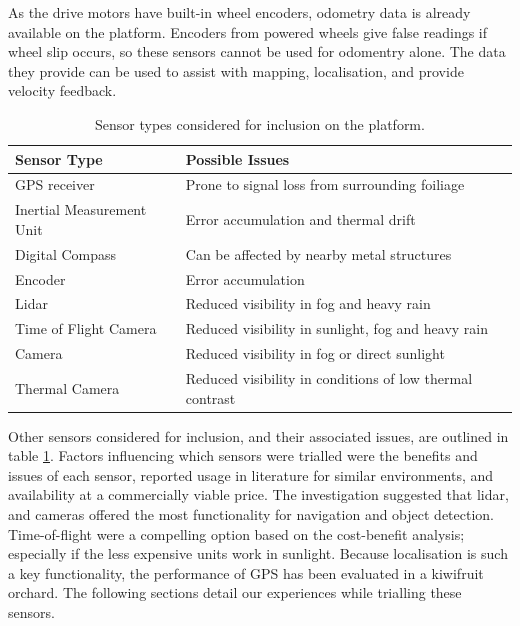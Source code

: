 \documentclass[preprint,authoryear,12pt]{elsarticle}
\begin{document}
    As the drive motors have built-in wheel encoders, odometry data is already available on the platform.
    Encoders from powered wheels give false readings if wheel slip occurs, so these sensors cannot be used for odomentry alone.
    The data they provide can be used to assist with mapping, localisation, and provide velocity feedback.

    \begin{table}[htbp]
        \centering
        \footnotesize
        \begin{tabular}{ l l} 
            \textbf{Sensor Type}      &\textbf{Possible Issues} \\ \hline
            GPS receiver              & Prone to signal loss from surrounding foiliage\\  \hline
            Inertial Measurement Unit & Error accumulation and thermal drift\\ \hline
            Digital Compass           & Can be affected by nearby metal structures\\ \hline
            Encoder                   & Error accumulation \\ \hline
            Lidar                     & Reduced visibility in fog and heavy rain \\ \hline
            Time of Flight Camera     & Reduced visibility in sunlight, fog and heavy rain \\ \hline
            Camera                    & Reduced visibility in fog or direct sunlight \\ \hline
            Thermal Camera            & Reduced visibility in conditions of low thermal contrast\\ \hline
        \end{tabular}
        \label{table:sensor_comparison}
        \caption{Sensor types considered for inclusion on the platform.}
    \end{table}

    Other sensors considered for inclusion, and their associated issues, are outlined in table \ref{table:sensor_comparison}.
    Factors influencing which sensors were trialled were the benefits and issues of each sensor, reported usage in literature for similar environments, and availability at a commercially viable price.
    The investigation suggested that lidar, and cameras offered the most functionality for navigation and object detection.
    Time-of-flight were a compelling option based on the cost-benefit analysis; especially if the less expensive units work in sunlight.
    Because localisation is such a key functionality, the performance of GPS has been evaluated in a kiwifruit orchard.
    The following sections detail our experiences while trialling these sensors.
\end{document}
